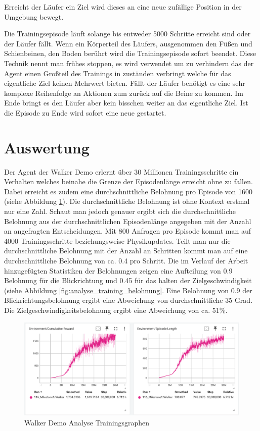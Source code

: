 Erreicht der Läufer ein Ziel wird dieses an eine neue zufällige Position in der Umgebung bewegt.

Die Trainingsepisode läuft solange bis entweder 5000 Schritte erreicht sind oder der Läufer fällt. Wenn ein Körperteil des Läufers, ausgenommen den Füßen und Schienbeinen, den Boden berührt wird die Trainingsepisode sofort beendet. Diese Technik nennt man frühes stoppen, es wird verwendet um zu verhindern das der Agent einen Großteil des Trainings in zuständen verbringt welche für das eigentliche Ziel keinen Mehrwert bieten. Fällt der Läufer benötigt es eine sehr komplexe Reihenfolge an Aktionen zum zurück auf die Beine zu kommen. Im Ende bringt es den Läufer aber kein bisschen weiter an das eigentliche Ziel. Ist die Episode zu Ende wird sofort eine neue gestartet.

\section{Auswertung}
Der Agent der Walker Demo erlernt über 30 Millionen Trainingsschritte ein Verhalten welches beinahe die Grenze der Episodenlänge erreicht ohne zu fallen. Dabei erreicht es zudem eine durchschnittliche Belohnung pro Episode von 1600 (siehe Abbildung \ref{fig:analyse_training}). Die durchschnittliche Belohnung ist ohne Kontext erstmal nur eine Zahl. Schaut man jedoch genauer ergibt sich die durchschnittliche Belohnung aus der durchschnittlichen Episodenlänge angegeben mit der Anzahl an angefragten Entscheidungen. Mit 800 Anfragen pro Episode kommt man auf 4000 Trainingsschritte beziehungsweise Physikupdates. Teilt man nur die durchschnittliche Belohnung mit der Anzahl an Schritten kommt man auf eine durchschnittliche Belohnung von ca. 0.4 pro Schritt. Die im Verlauf der Arbeit hinzugefügten Statistiken der Belohnungen zeigen eine Aufteilung von 0.9 Belohnung für die Blickrichtung und 0.45 für das halten der Zielgeschwindigkeit (siehe Abbildung \ref{fig:analyse_training_belohnung}. Eine Belohnung von 0.9 der Blickrichtungsbelohnung ergibt eine Abweichung von durchschnittliche 35 Grad. Die Zielgeschwindigkeitsbelohnung ergibt eine Abweichung von ca. 51\%.

\begin{figure}[H]
  \centering  
  \includegraphics[scale=0.5]{img/analyse_training.png}
  \caption{Walker Demo Analyse Trainingsgraphen}
  \label{fig:analyse_training}
\end{figure}

